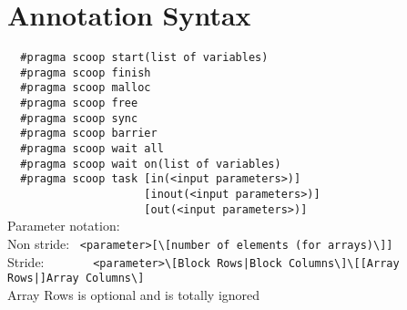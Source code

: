 \documentclass[
a4paper,
12pt,
]{article}
\begin{document}
\newpage
\tableofcontents{}
\newpage
{}
\pagestyle{headings}

\section{Annotation Syntax}

    \verb!  #pragma scoop start(list of variables)!\\
    \verb!  #pragma scoop finish!\\
    \verb!  #pragma scoop malloc!\\
    \verb!  #pragma scoop free!\\
    \verb!  #pragma scoop sync!\\
    \verb!  #pragma scoop barrier!\\
    \verb!  #pragma scoop wait all!\\
    \verb!  #pragma scoop wait on(list of variables)!\\
    \verb!  #pragma scoop task [in(<input parameters>)]!\\
    \verb!                     [inout(<input parameters>)]!\\
    \verb!                     [out(<input parameters>)]!\\[1em]

    Parameter notation:\\

      Non stride: \ \verb!<parameter>[\[number of elements (for arrays)\]]!
      \\

      Stride: \ \ \ \ \ \ \ \verb!<parameter>\[Block Rows|Block Columns\]\[[Array Rows|]Array Columns\]!\\
        \hspace{2cm}Array Rows is optional and is totally ignored\\

\end{document}
